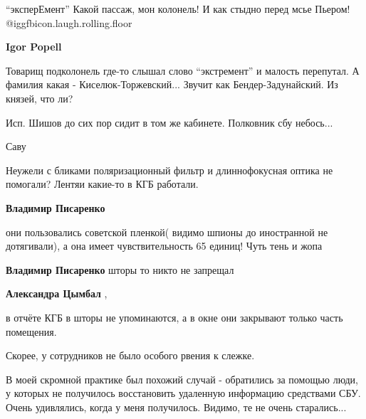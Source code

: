  
 
 
 
 
\zzSecCmt

\begin{itemize} %
\enquote{эксперЕмент}
Какой пассаж, мон колонель! И как стыдно перед мсье Пьером!  @igg{fbicon.laugh.rolling.floor} 

\begin{itemize} %
\textbf{Igor Popell} 

Товарищ подколонель где-то слышал слово \enquote{экстремент} и малость перепутал. А
фамилия какая - Киселюк-Торжевский... Звучит как Бендер-Задунайский. Из князей,
что ли?

\end{itemize} %

Исп. Шишов до сих пор сидит в том же кабинете. Полковник сбу небось...

Саву


Неужели с бликами поляризационный фильтр и длиннофокусная оптика не помогали?
Лентяи какие-то в КГБ работали.

\begin{itemize} %
\textbf{Владимир Писаренко} 

они пользовались советской пленкой( видимо шпионы до иностранной не
дотягивали), а она имеет чувствительность 65 единиц! Чуть тень и жопа


\textbf{Владимир Писаренко} шторы то никто не запрещал

\textbf{Александра Цымбал} , 

в отчёте КГБ в шторы не упоминаются, а в окне они закрывают только часть
помещения.

Скорее, у сотрудников не было особого рвения к слежке.

В моей скромной практике был похожий случай - обратились за помощью люди, у
которых не получилось восстановить удаленную информацию средствами СБУ. Очень
удивлялись, когда у меня получилось. Видимо, те не очень старались...


\end{itemize}
\end{itemize}

